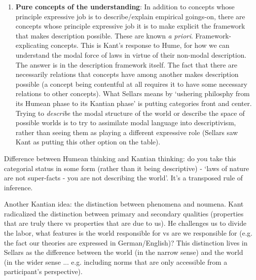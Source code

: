 \begin{enumerate}
\item \textbf{Pure concepts of the understanding}: In addition to concepts whose principle expressive job is to describe/explain empirical goings-on, there are concepts whose principle expressive job it is to make explicit the framework that makes description possible. These are known \textit{a priori}. Framework-explicating concepts. This is Kant's response to Hume, for how we can understand the modal force of laws in virtue of their non-modal description. The answer is in the description framework itself. The fact that there are necessarily relations that concepts have among another makes description possible (a concept being contentful at all requires it to have some necessary relations to other concepts). What Sellars means by `ushering philosphy from its Humean phase to its Kantian phase' is putting categories front and center. Trying to \emph{describe} the modal structure of the world or describe the space of possible worlds is to try to assimilate modal language into descriptivism, rather than seeing them as playing a different expressive role (Sellars saw Kant as putting this other option on the table).
\end{enumerate}

Difference between Humean thinking and Kantian thinking: do you take this categorial status in some form (rather than it being descriptive) - `laws of nature are not super-facts - you are not describing the world'. It's a transposed rule of inference.

Another Kantian idea: the distinction between phenomena and noumena. Kant radicalized the distinction between primary and secondary qualities (properties that are truly there vs properties that are due to us). He challenges us to divide the labor, what features is the world responsible for vs are we responsible for (e.g. the fact our theories are expressed in German/English)? This distinction lives in Sellars as the difference between the world (in the narrow sense) and the world (in the wider sense ... e.g. including norms that are only accessible from a participant's perspective).
